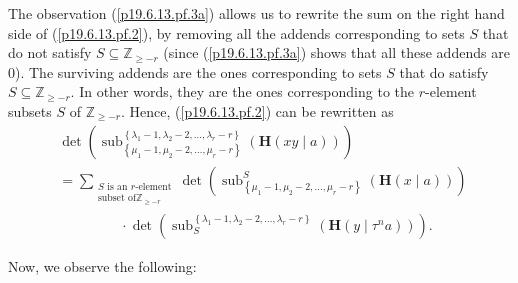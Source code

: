\documentclass[numbers=enddot,12pt,final,onecolumn,notitlepage]{scrartcl}%
\theoremstyle{definition}
\let\sumnonlimits\sum
\renewcommand{\sum}{\sumnonlimits\limits}
\begin{document}
\begin{enumerate}
The observation (\ref{p19.6.13.pf.3a}) allows us to rewrite the sum on the
right hand side of (\ref{p19.6.13.pf.2}), by removing all the addends
corresponding to sets $S$ that do not satisfy $S\subseteq\mathbb{Z}_{\geq-r}$
(since (\ref{p19.6.13.pf.3a}) shows that all these addends are $0$). The
surviving addends are the ones corresponding to sets $S$ that do satisfy
$S\subseteq\mathbb{Z}_{\geq-r}$. In other words, they are the ones
corresponding to the $r$-element subsets $S$ of $\mathbb{Z}_{\geq-r}$. Hence,
(\ref{p19.6.13.pf.2}) can be rewritten as%
\begin{align}
&  \det\left(  \operatorname*{sub}\nolimits_{\left\{  \mu_{1}-1,\mu
_{2}-2,\ldots,\mu_{r}-r\right\}  }^{\left\{  \lambda_{1}-1,\lambda
_{2}-2,\ldots,\lambda_{r}-r\right\}  }\left(  \mathbf{H}\left(  xy\mid
a\right)  \right)  \right) \nonumber\\
&  =\sum_{\substack{S\text{ is an }r\text{-element}\\\text{subset of
}\mathbb{Z}_{\geq-r}}}\det\left(  \operatorname*{sub}\nolimits_{\left\{
\mu_{1}-1,\mu_{2}-2,\ldots,\mu_{r}-r\right\}  }^{S}\left(  \mathbf{H}\left(
x\mid a\right)  \right)  \right) \nonumber\\
&  \ \ \ \ \ \ \ \ \ \ \ \ \ \ \ \ \ \ \ \ \cdot\det\left(
\operatorname*{sub}\nolimits_{S}^{\left\{  \lambda_{1}-1,\lambda_{2}%
-2,\ldots,\lambda_{r}-r\right\}  }\left(  \mathbf{H}\left(  y\mid\tau
^{n}a\right)  \right)  \right)
.\ \ \ \ \ \ \ \ \ \ \ \ \ \label{p19.6.13.pf.3b}%
\end{align}


Now, we observe the following:


\end{enumerate}
\end{document}
